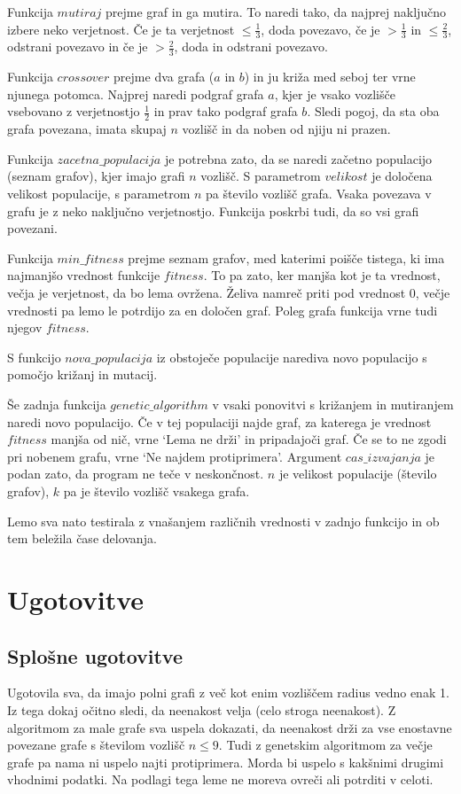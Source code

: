 \documentclass[a4paper, 10pt]{article}
\begin{document}
Funkcija $mutiraj$ prejme graf in ga mutira. To naredi tako, da najprej naključno izbere neko verjetnost. Če je ta verjetnost $\leq\frac{1}{3}$, doda povezavo, če je  $> \frac{1}{3}$ in $\leq \frac{2}{3}$, odstrani povezavo in če je $> \frac{2}{3}$, doda in odstrani povezavo. %

Funkcija $crossover$ prejme dva grafa ($a$ in $b$) in ju križa med seboj ter vrne njunega potomca. Najprej naredi podgraf grafa $a$, kjer je vsako vozlišče vsebovano z verjetnostjo $\frac{1}{2}$ in prav tako podgraf grafa $b$. Sledi pogoj, da sta oba grafa povezana, imata skupaj $n$ vozlišč in da noben od njiju ni prazen. %

Funkcija $zacetna\_populacija$ je potrebna zato, da se naredi začetno populacijo (seznam grafov), kjer imajo grafi $n$ vozlišč. S parametrom $velikost$ je določena velikost populacije, s parametrom $n$ pa število vozlišč grafa. Vsaka povezava v grafu je z neko naključno verjetnostjo. Funkcija poskrbi tudi, da so vsi grafi povezani.

Funkcija $min\_fitness$ prejme seznam grafov, med katerimi poišče tistega, ki ima najmanjšo vrednost funkcije $fitness$. To pa zato, ker manjša kot je ta vrednost, večja je verjetnost, da bo lema ovržena. Želiva namreč priti pod vrednost 0, večje vrednosti pa lemo le potrdijo za en določen graf. Poleg grafa funkcija vrne tudi njegov $fitness$.

S funkcijo $nova\_populacija$ iz obstoječe populacije narediva novo populacijo s pomočjo križanj in mutacij.%

Še zadnja funkcija $genetic\_algorithm$ v vsaki ponovitvi s križanjem in mutiranjem naredi novo populacijo. Če v tej populaciji najde graf, za katerega je vrednost $fitness$ manjša od nič, vrne `Lema ne drži' in pripadajoči graf. Če se to ne zgodi pri nobenem grafu, vrne `Ne najdem protiprimera'. Argument $cas\_izvajanja$ je podan zato, da program ne teče v neskončnost. $n$ je velikost populacije (število grafov), $k$ pa je število vozlišč vsakega grafa.

Lemo sva nato testirala z vnašanjem različnih vrednosti v zadnjo funkcijo in ob tem beležila čase delovanja.

\section{Ugotovitve}
\subsection{Splošne ugotovitve}
Ugotovila sva, da imajo polni grafi z več kot enim vozliščem radius vedno enak 1. Iz tega dokaj očitno sledi, da neenakost velja (celo stroga neenakost).
Z algoritmom za male grafe sva uspela dokazati, da neenakost drži za vse enostavne povezane grafe s številom vozlišč  $n \leq 9$.
Tudi z genetskim algoritmom za večje grafe pa nama ni uspelo najti protiprimera. Morda bi uspelo s kakšnimi drugimi vhodnimi podatki.
Na podlagi tega leme ne moreva ovreči ali potrditi v celoti.
\end{document}
